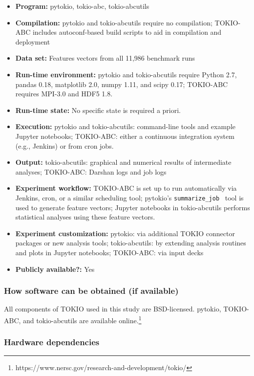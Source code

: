 {\small
\begin{itemize}
  \item {\bf Program: } pytokio, tokio-abc, tokio-abcutils
  \item {\bf Compilation: } pytokio and tokio-abcutils require no compilation; TOKIO-ABC includes autoconf-based build scripts to aid in compilation and deployment
  \item {\bf Data set:} Features vectors from all 11,986 benchmark runs
  \item {\bf Run-time environment: } pytokio and tokio-abcutils require Python 2.7, pandas 0.18, matplotlib 2.0, numpy 1.11, and scipy 0.17; TOKIO-ABC requires MPI-3.0 and HDF5 1.8.
  \item {\bf Run-time state: } No specific state is required a priori.
  \item {\bf Execution: } pytokio and tokio-abcutils: command-line tools and example Jupyter notebooks; TOKIO-ABC: either a continuous integration system (e.g., Jenkins) or from cron jobs.
  \item {\bf Output: } tokio-abcutils: graphical and numerical results of intermediate analyses; TOKIO-ABC: Darshan logs and job logs
  \item {\bf Experiment workflow: } TOKIO-ABC is set up to run automatically via Jenkins, cron, or a similar scheduling tool; pytokio's \texttt{summarize\_job}~\cite{Lockwood2018tokio} tool is used to generate feature vectors; Jupyter notebooks in tokio-abcutils performs statistical analyses using these feature vectors.
  \item {\bf Experiment customization: } pytokio: via additional TOKIO connector packages or new analysis tools; tokio-abcutils: by extending analysis routines and plots in Jupyter notebooks; TOKIO-ABC: via input decks
  \item {\bf Publicly available?: } Yes
\end{itemize}
}

\subsubsection{How software can be obtained (if available)}

All components of TOKIO used in this study are BSD-licensed.
pytokio, TOKIO-ABC, and tokio-abcutils are available online.\footnote{https://www.nersc.gov/research-and-development/tokio/}

\subsubsection{Hardware dependencies}

